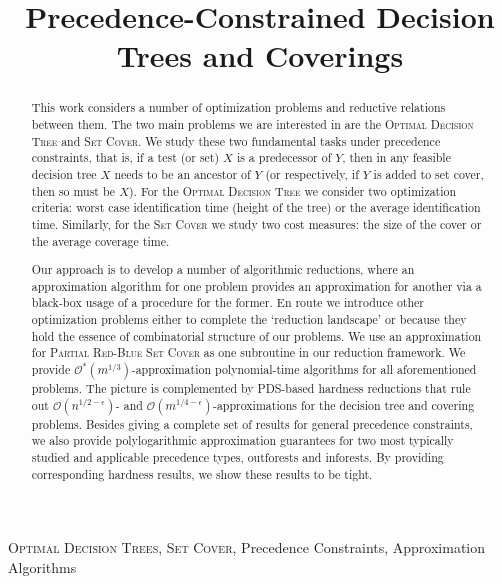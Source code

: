 \documentclass[anon,12pt]{colt2026} %
\title[Precedence-Constrained Decision Trees and Coverings]{Precedence-Constrained Decision Trees and Coverings}
\newcommand{\br}[1]{\mathopen{}\left( #1 \right)}
\newcommand{\bigo}{\mathcal{O}}
\begin{document}
\maketitle

\begin{abstract}
This work considers a number of optimization problems and reductive relations between them.
The two main problems we are interested in are the \textup{\textsc{Optimal Decision Tree}} and \textup{\textsc{Set Cover}}.
We study these two fundamental tasks under precedence constraints, that is, if a test (or set) $X$ is a predecessor of $Y$, then in any feasible decision tree $X$ needs to be an ancestor of $Y$ (or respectively, if $Y$ is added to set cover, then so must be $X$).
For the \textup{\textsc{Optimal Decision Tree}} we consider two optimization criteria: worst case identification time (height of the tree) or the average identification time.
Similarly, for the \textup{\textsc{Set Cover}} we study two cost measures: the size of the cover or the average coverage time.

Our approach is to develop a number of algorithmic reductions, where an approximation algorithm for one problem provides an approximation for another via a black-box usage of a procedure for the former.
En route we introduce other optimization problems either to complete the `reduction landscape' or because they hold the essence of combinatorial structure of our problems.
We use an approximation for \textup{\textsc{Partial Red-Blue Set Cover}} as one subroutine in our reduction framework. We provide $\bigo^*(m^{1/3})$-approximation polynomial-time algorithms for all aforementioned problems.
The picture is complemented by PDS-based hardness reductions that rule out $\bigo\br{n^{1/2-\epsilon}}$- and $\bigo\br{m^{1/4-\epsilon}}$-approximations for the decision tree and covering problems.
Besides giving a complete set of results for general precedence constraints, we also provide polylogarithmic approximation guarantees for two most typically studied and applicable precedence types, outforests and inforests. By providing corresponding hardness results, we show these results to be tight.
\end{abstract}


\begin{keywords}%
  \textup{\textsc{Optimal Decision Trees}}, \textup{\textsc{Set Cover}}, Precedence Constraints, Approximation Algorithms%
\end{keywords}



% 


\end{document}
